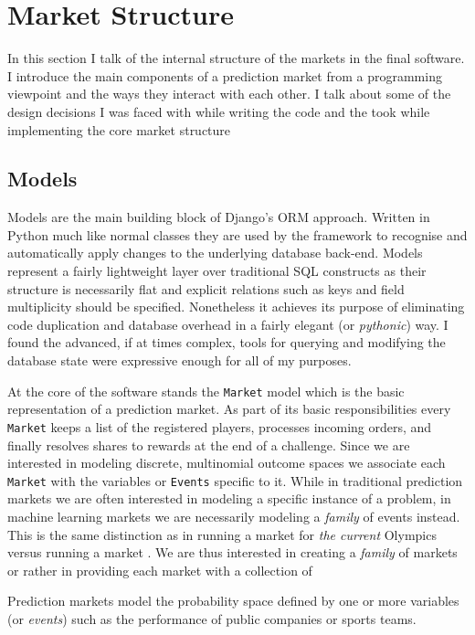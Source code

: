 \documentclass[bsc,frontabs,twoside,singlespacing,parskip,deptreport]{infthesis}     %
\begin{document}
\section{Market Structure}
In this section I talk of the internal structure of the markets in the final software. I introduce the main components of a prediction market from a programming viewpoint and the ways they interact with each other. I talk about some of the design decisions I was faced with while writing the code and the took while implementing the core market structure

\subsection{Models}
    Models are the main building block of Django's ORM approach. Written in Python much like normal classes they are used by the framework to recognise and automatically apply changes to the underlying database back-end. Models represent a fairly lightweight layer over traditional SQL constructs as their structure is necessarily flat and explicit relations such as keys and field multiplicity should be specified. Nonetheless it achieves its purpose of eliminating code duplication and database overhead in a fairly elegant (or {\em pythonic}) way. I found the advanced, if at times complex, tools for querying and modifying the database state were expressive enough for all of my purposes.     
    
    At the core of the software stands the {\tt Market} model which is the basic representation of a prediction market. As part of its basic responsibilities every {\tt Market} keeps a list of the registered players, processes incoming orders, and finally resolves shares to rewards at the end of a challenge. Since we are interested in modeling discrete, multinomial outcome spaces we associate each {\tt Market} with the variables or {\tt Events} specific to it. While in traditional prediction markets we are often interested in modeling a specific instance of a problem, in machine learning markets we are necessarily modeling a {\em family} of events instead. This is the same distinction as in running a market for {\em the current} Olympics  versus running a market . We are thus interested in creating a {\em family} of markets or rather in providing each market with a collection of 
    
    Prediction markets model the probability space defined by one or more variables (or {\em events}) such as the performance of public companies or sports teams. 
    
\end{document}
